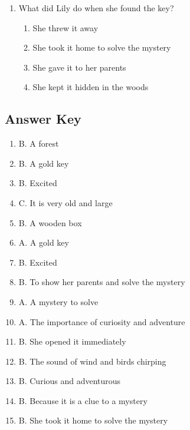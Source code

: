 \documentclass[12pt]{article}
\begin{document}
\begin{enumerate}
    \item What did Lily do when she found the key?
    \begin{enumerate}[label=\Alph*.]
        \item She threw it away
        \item She took it home to solve the mystery
        \item She gave it to her parents
        \item She kept it hidden in the woods
    \end{enumerate}
    \vspace{0.5cm}

\end{enumerate}
\vspace{10cm}


\subsection*{Answer Key}

\begin{enumerate}
    \item B. A forest
    \item B. A gold key
    \item B. Excited
    \item C. It is very old and large
    \item B. A wooden box
    \item A. A gold key
    \item B. Excited
    \item B. To show her parents and solve the mystery
    \item A. A mystery to solve
    \item A. The importance of curiosity and adventure
    \item B. She opened it immediately
    \item B. The sound of wind and birds chirping
    \item B. Curious and adventurous
    \item B. Because it is a clue to a mystery
    \item B. She took it home to solve the mystery
\end{enumerate}
\end{document}
